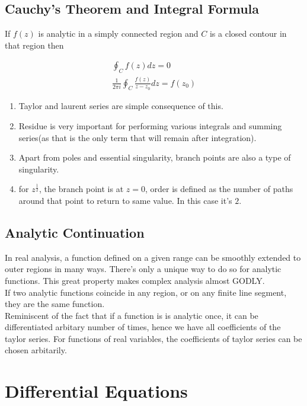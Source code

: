 \documentclass{report}
\begin{document}
\section{Cauchy's Theorem and Integral Formula} If $f(z)$ is analytic in a simply connected region and $C$ is a closed contour in that region then

\begin{gather}
\oint_{C}f(z)dz = 0\\
\frac{1}{2\pi i}\oint_{C}\frac{f(z)}{z-z_0}dz = f(z_0)
\end{gather}

\begin{enumerate}
  \item Taylor and laurent series are simple consequence of this.
  \item Residue is very important for performing various integrals and summing series(as that is the only term that will remain after integration). 
  \item Apart from poles and essential singularity, branch points are also a type of singularity.
  \item for $z^\frac{1}{2}$, the branch point is at $z=0$, order is defined as the number of paths around that point to return to same value. In this case it's $2$.
\end{enumerate}


\section{Analytic Continuation}
In real analysis, a function defined on a given range can be smoothly extended to outer regions in many ways. There's only a unique way to do so for analytic functions. This great property makes complex analysis almost GODLY.\\

\noindent If two analytic functions coincide in any region, or on any finite line segment, they are the same function.\\

\noindent Reminiscent of the fact that if a function is is analytic once, it can be differentiated arbitary number of times, hence we have all coefficients of the taylor series. For functions of real variables, the coefficients of taylor series can be chosen arbitarily.


\chapter{Differential Equations}
\end{document}
